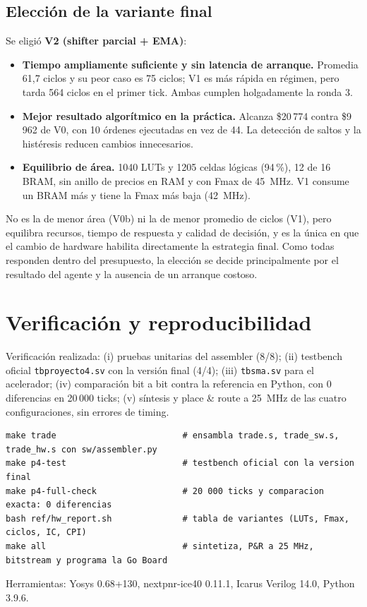 \documentclass[11pt,letterpaper]{article}
\renewcommand{\_}{\textunderscore\allowbreak}
\begin{document}
\subsection{Elección de la variante final}
Se eligió \textbf{V2 (shifter parcial + EMA)}:
\begin{itemize}
  \item \textbf{Tiempo ampliamente suficiente y sin latencia de arranque.} Promedia 61,7 ciclos y su peor caso es 75 ciclos; V1 es más rápida en régimen, pero tarda 564 ciclos en el primer tick. Ambas cumplen holgadamente la ronda 3.
  \item \textbf{Mejor resultado algorítmico en la práctica.} Alcanza \$20\,774 contra \$9\,962 de V0, con 10 órdenes ejecutadas en vez de 44. La detección de saltos y la histéresis reducen cambios innecesarios.
  \item \textbf{Equilibrio de área.} 1040 LUTs y 1205 celdas lógicas (94\,\%), 12 de 16 BRAM, sin anillo de precios en RAM y con Fmax de 45~MHz. V1 consume un BRAM más y tiene la Fmax más baja (42~MHz).
\end{itemize}
No es la de menor área (V0b) ni la de menor promedio de ciclos (V1), pero equilibra recursos, tiempo de respuesta y calidad de decisión, y es la única en que el cambio de hardware habilita directamente la estrategia final. Como todas responden dentro del presupuesto, la elección se decide principalmente por el resultado del agente y la ausencia de un arranque costoso.

\section{Verificación y reproducibilidad}\label{sec:repro}
Verificación realizada: (i) pruebas unitarias del assembler (8/8); (ii) testbench oficial \texttt{tb\_proyecto\_4.sv} con la versión final (4/4); (iii) \texttt{tb\_sma.sv} para el acelerador; (iv) comparación bit a bit contra la referencia en Python, con 0 diferencias en 20\,000 ticks; (v) síntesis y place \& route a 25~MHz de las cuatro configuraciones, sin errores de timing.

\begin{lstlisting}[style=shell]
make trade                         # ensambla trade.s, trade_sw.s, trade_hw.s con sw/assembler.py
make p4-test                       # testbench oficial con la version final
make p4-full-check                 # 20 000 ticks y comparacion exacta: 0 diferencias
bash ref/hw_report.sh              # tabla de variantes (LUTs, Fmax, ciclos, IC, CPI)
make all                           # sintetiza, P&R a 25 MHz, bitstream y programa la Go Board
\end{lstlisting}
Herramientas: Yosys 0.68+130, nextpnr-ice40 0.11.1, Icarus Verilog 14.0, Python 3.9.6.
\end{document}

